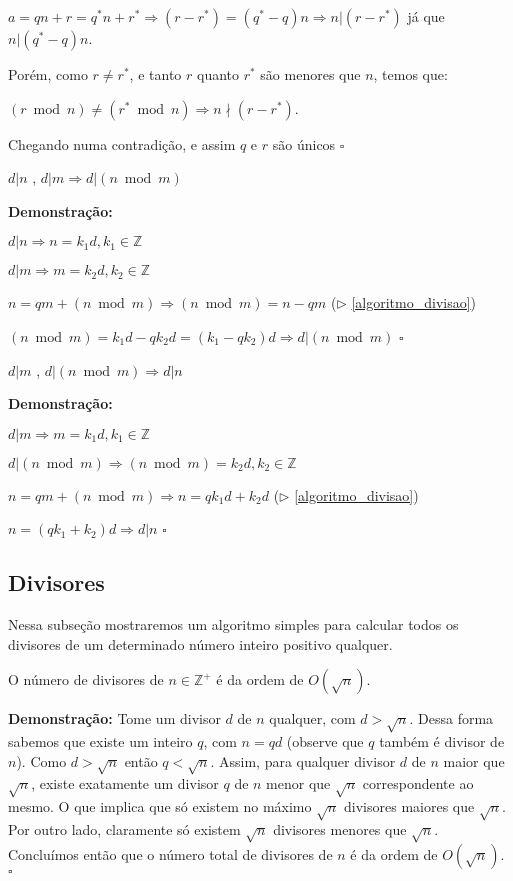 $a = qn + r = q^*n + r^* \Rightarrow (r - r^*) = (q^* - q)n \Rightarrow n|(r - r^*)$ já que $n|(q^* - q)n$.

Porém, como $r \neq r^*$, e tanto $r$ quanto $r^*$ são menores que $n$, temos que: 

$(r\bmod n) \neq (r^*\bmod n) \Rightarrow n \nmid (r - r^*)$.

Chegando numa contradição, e assim $q$ e $r$ são únicos $\square$ \\

\begin{corollary}\label{divisibilidade_modular}
$d|n$ , $d|m \Rightarrow d|(n \bmod m)$
\end{corollary}
\textbf{Demonstração:}

$d|n \Rightarrow n = k_1d, k_1 \in \mathbb{Z}$

$d|m \Rightarrow m = k_2d, k_2 \in \mathbb{Z}$

$n = qm + (n \bmod m) \Rightarrow (n \bmod m) = n - qm$ ($\triangleright$ \autoref{algoritmo_divisao})

$(n \bmod m) = k_1d - qk_2d = (k_1 - qk_2)d \Rightarrow d|(n \bmod m)$ $\square$


\begin{corollary}\label{divisibilidade_modular2}
$d|m$ , $d|(n \bmod m) \Rightarrow d|n$
\end{corollary}
\textbf{Demonstração:}

$d|m \Rightarrow m = k_1d, k_1 \in \mathbb{Z}$

$d|(n \bmod m) \Rightarrow (n \bmod m) = k_2d, k_2 \in \mathbb{Z}$

$n = qm + (n \bmod m) \Rightarrow n = qk_1d + k_2d$ ($\triangleright$ \autoref{algoritmo_divisao})

$n = (qk_1 + k_2)d \Rightarrow d|n$ $\square$


\subsection{Divisores}
Nessa subseção mostraremos um algoritmo simples para calcular todos os divisores de um determinado número inteiro positivo qualquer.

\begin{theorem} 
O número de divisores de $n \in \mathbb{Z}^{+}$ é da ordem de $O(\sqrt{n})$.
\end{theorem}
\textbf{Demonstração:}
Tome um divisor $d$ de $n$ qualquer, com $d > \sqrt{n}$. Dessa forma sabemos que existe um inteiro $q$, com $n=qd$ (observe que $q$ também é divisor de $n$). 
Como $d > \sqrt{n}$ então $q < \sqrt{n}$. Assim, para qualquer divisor $d$ de $n$ maior que $\sqrt{n}$, existe exatamente um divisor $q$ de $n$ menor que $\sqrt{n}$ correspondente ao mesmo.
O que implica que só existem no máximo $\sqrt{n}$ divisores maiores que $\sqrt{n}$. Por outro lado, claramente só existem $\sqrt{n}$ divisores menores que $\sqrt{n}$.
Concluímos então que o número total de divisores de $n$ é da ordem de $O(\sqrt{n})$. $\square$
\\

